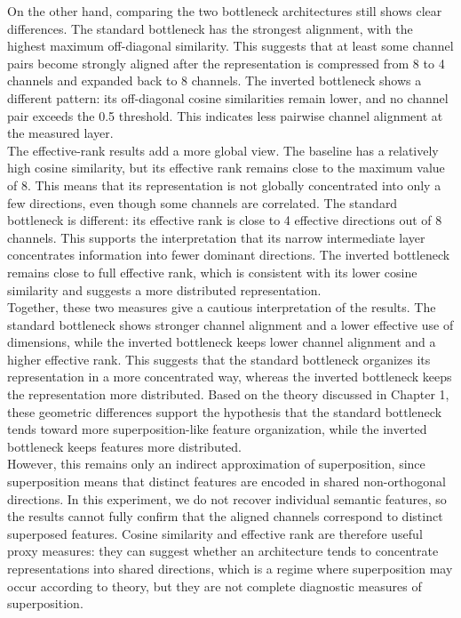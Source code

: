\documentclass[12pt,a4paper]{report}
\begin{document}
On the other hand, comparing the two bottleneck architectures still shows clear differences. The standard bottleneck has the strongest alignment, with the highest maximum off-diagonal similarity. This suggests that at least some channel pairs become strongly aligned after the representation is compressed from 8 to 4 channels and expanded back to 8 channels. The inverted bottleneck shows a different pattern: its off-diagonal cosine similarities remain lower, and no channel pair exceeds the 0.5 threshold. This indicates less pairwise channel alignment at the measured layer.\\

The effective-rank results add a more global view. The baseline has a relatively high cosine similarity, but its effective rank remains close to the maximum value of 8. This means that its representation is not globally concentrated into only a few directions, even though some channels are correlated. The standard bottleneck is different: its effective rank is close to 4 effective directions out of 8 channels. This supports the interpretation that its narrow intermediate layer concentrates information into fewer dominant directions. The inverted bottleneck remains close to full effective rank, which is consistent with its lower cosine similarity and suggests a more distributed representation.\\

Together, these two measures give a cautious interpretation of the results. The standard bottleneck shows stronger channel alignment and a lower effective use of dimensions, while the inverted bottleneck keeps lower channel alignment and a higher effective rank. This suggests that the standard bottleneck organizes its representation in a more concentrated way, whereas the inverted bottleneck keeps the representation more distributed. 
Based on the theory discussed in Chapter 1, these geometric differences support the hypothesis that the standard bottleneck tends toward more superposition-like feature organization, while the inverted bottleneck keeps features more distributed.\\

However, this remains only an indirect approximation of superposition, since superposition means that distinct features are encoded in shared non-orthogonal directions. In this experiment, we do not recover individual semantic features, so the results cannot fully confirm that the aligned channels correspond to distinct superposed features. Cosine similarity and effective rank are therefore useful proxy measures: they can suggest whether an architecture tends to concentrate representations into shared directions, which is a regime where superposition may occur according to theory, but they are not complete diagnostic measures of superposition.\\
\end{document}
